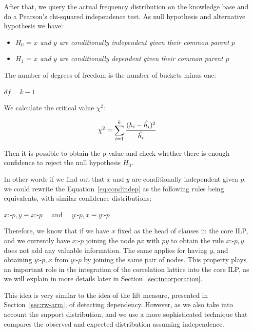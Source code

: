 After that, we query the actual frequency distribution on the knowledge base and do a Pearson's chi-squared
independence test. As null hypothesis and alternative hypothesis we have:

\begin{itemize}
 \item $H_0$ = \emph{$x$ and $y$ are conditionally independent given their common parent $p$}
 \item $H_1$ = \emph{$x$ and $y$ are conditionally dependent given their common parent $p$} 
\end{itemize}

The number of degrees of freedom is the number of buckets minus one:

\begin{center}
 $df=k-1$
\end{center}

We calculate the critical value $\chi^2$:

\begin{equation}
 \chi^2=\sum_{i=1}^{k} \cfrac{(h_i - \hat{h_i})^2}{\hat{h_i}}
\end{equation}

Then it is possible to obtain the p-value and check whether there is enough confidence to reject the null hypothesis
$H_0$. 


In other words if we find out that $x$ and $y$ are conditionally independent given $p$, we could rewrite the
Equation~\ref{eq:condindep} as the following rules being equivalents, with similar confidence distributions:

\begin{center}
  $x$:-$p,y \equiv x$:-$p \quad$ and  $\quad y$:-$p,x \equiv y$:-$p$
\end{center}

Therefore, we know that if we have $x$ fixed as the head of clauses in the core ILP, and we currently have $x$:-$p$
joining the node $px$ with $py$ to obtain the rule $x$:-$p,y$ does not add any valuable information. The same
applies for having $y$, and obtaining $y$:-$p,x$ from $y$:-$p$ by joining the same pair of nodes. This
property plays an important role in the integration of the correlation lattice into the core ILP, as we will explain in
more details later in Section~\ref{sec:incorporation}.

This idea is very similar to the idea of the lift measure, presented in Section~\ref{sec:rw-arm}, of detecting
dependency. However, as we also take into account the support distribution, and we use a more sophisticated technique
that compares the observed and expected distribution assuming independence.

